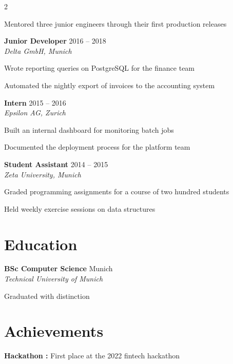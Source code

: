 \documentclass[10pt]{extarticle}
\newcommand{\role}[3]{%
  \textbf{#1} \hfill {\color{soft}\small #3}\\[-1pt]
  {\itshape\small #2}\par
}
\newcommand{\edu}[3]{%
  \textbf{#1} \hfill {\color{soft}\small #3}\\[-1pt]
  {\itshape\small #2}\par
}
\begin{document}
\begin{multicols}{2}
\begin{tightlist}
    \item Mentored three junior engineers through their first production releases

\end{tightlist}

\role{Junior Developer}{Delta GmbH, Munich}{2016 – 2018}

\begin{tightlist}
    \item Wrote reporting queries on PostgreSQL for the finance team

    \item Automated the nightly export of invoices to the accounting system

\end{tightlist}

\role{Intern}{Epsilon AG, Zurich}{2015 – 2016}

\begin{tightlist}
    \item Built an internal dashboard for monitoring batch jobs

    \item Documented the deployment process for the platform team

\end{tightlist}

\role{Student Assistant}{Zeta University, Munich}{2014 – 2015}

\begin{tightlist}
    \item Graded programming assignments for a course of two hundred students

    \item Held weekly exercise sessions on data structures

\end{tightlist}

\section{Education}

\edu{BSc Computer Science}{Technical University of Munich}{Munich}

{\footnotesize Graduated with distinction}

\section{Achievements}

\begin{tightlist}
\item \textbf{Hackathon :} First place at the 2022 fintech hackathon
\end{tightlist}


\end{multicols}
\end{document}

